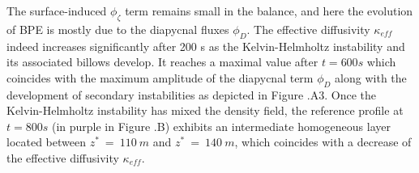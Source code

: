 The surface-induced $\phi_{\zeta}$ term remains small in the balance, and here the evolution of BPE is mostly due to the diapycnal fluxes $\phi_D$. The effective diffusivity $\kappa_{eff}$ indeed increases significantly after 200 s as the Kelvin-Helmholtz instability and its associated billows develop. It reaches a maximal value after $t=600 s$ which coincides with the maximum amplitude of the diapycnal term $\phi_D$ along with the development of secondary instabilities as depicted in Figure .A3.
Once the Kelvin-Helmholtz instability has mixed the density field, the reference profile at $t=800s$ (in purple in Figure .B) exhibits an intermediate homogeneous layer located between $z^*\ =\ 110\ m$ and $z^*\ =\ 140\ m$, which coincides with a decrease of the effective diffusivity $\kappa_{eff}$.

